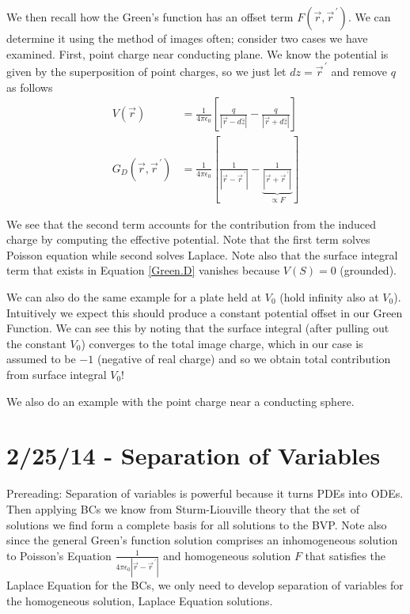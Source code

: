 \documentclass[10pt]{report}
\newcommand{\pvec}[1]{\vec{#1}^{\,\prime}}
\newcommand{\abs}[1]{\left|#1\right|}
\begin{document}
We then recall how the Green's function has an offset term $F(\vec{r}, \pvec{r})$. We can determine it using the method of images often; consider two cases we have examined. First, point charge near conducting plane. We know the potential is given by the superposition of point charges, so we just let $dz = \pvec{r}$ and remove $q$ as follows
\begin{align}
    V(\vec{r}) &= \frac{1}{4\pi\epsilon_0}\left[ \frac{q}{\abs{\vec{r} - d\hat{z}}} - \frac{q}{\abs{\vec{r} + d\hat{z}}} \right]\\
    G_D(\vec{r}, \pvec{r}) &= \frac{1}{4\pi\epsilon_0}\left[ \frac{1}{\abs{\vec{r} - \pvec{r}}} - \underbrace{\frac{1}{\abs{\vec{r} + \pvec{r}}}}_{\propto F} \right]
\end{align}

We see that the second term accounts for the contribution from the induced charge by computing the effective potential. Note that the first term solves Poisson equation while second solves Laplace. Note also that the surface integral term that exists in Equation \eqref{Green.D} vanishes because $V(S) = 0$ (grounded).

We can also do the same example for a plate held at $V_0$ (hold infinity also at $V_0$). Intuitively we expect this should produce a constant potential offset in our Green Function. We can see this by noting that the surface integral (after pulling out the constant $V_0$) converges to the total image charge, which in our case is assumed to be $-1$ (negative of real charge) and so we obtain total contribution from surface integral $V_0$!

We also do an example with the point charge near a conducting sphere.

\chapter{2/25/14 - Separation of Variables}

Prereading: Separation of variables is powerful because it turns PDEs into ODEs. Then applying BCs we know from Sturm-Liouville theory that the set of solutions we find form a complete basis for all solutions to the BVP. Note also since the general Green's function solution comprises an inhomogeneous solution to Poisson's Equation $\frac{1}{4\pi\epsilon_0\abs{\vec{r} - \pvec{r}}}$ and homogeneous solution $F$ that satisfies the Laplace Equation for the BCs, we only need to develop separation of variables for the homogeneous solution, Laplace Equation solutions.
\end{document}
